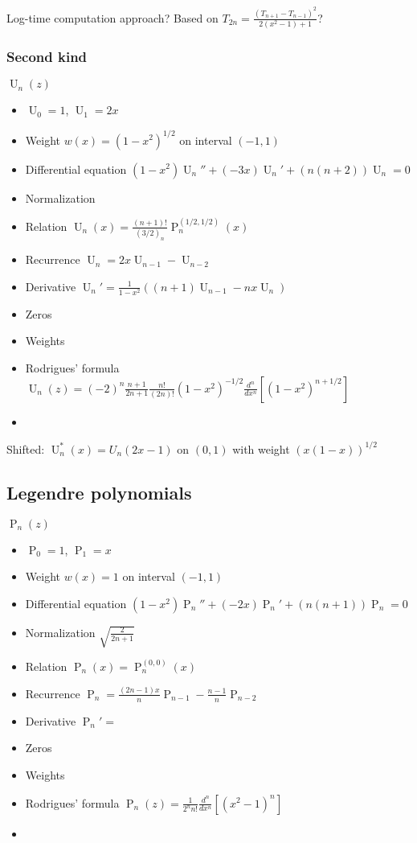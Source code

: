 \documentclass[10pt,dvipdfmx,letterpaper,twoside]{article}
\let\O=\operatorname
\begin{document}
Log-time computation approach? Based on $T_{2n} = \frac{(T_{n+1}-T_{n-1})^2}{2(x^2-1)+1}$?

\subsubsection{Second kind}
$\O{U}_n(z)$
\begin{itemize}
\item $\O{U}_0 = 1$, $\O{U}_1 = 2x$
\item Weight $w(x) = (1-x^2)^{1/2}$ on interval $(-1,1)$
\item Differential equation $\left(1-x^2\right) \O{U}_n'' + \left(-3x\right) \O{U}_n' + \left(n(n+2)\right) \O{U}_n = 0$
\item Normalization $ $
\item Relation $\O{U}_n(x) = \frac{(n+1)!}{(3/2)_n} \O{P}_n^{(1/2, 1/2)}(x)$
\item Recurrence $\O{U}_n = 2 x \O{U}_{n-1} - \O{U}_{n-2}$
\item Derivative $\O{U}_n' = \frac{1}{1-x^2}\left( (n+1)\O{U}_{n-1} - n x \O{U}_{n} \right)$
\item Zeros
\item Weights
\item Rodrigues' formula $\O{U}_n(z) = (-2)^n\frac{n+1}{2n+1}\frac{n!}{(2n)!} (1-x^2)^{-1/2} \frac{d^n}{dx^n}\left[ (1-x^2)^{n+1/2} \right]$
\item 
\end{itemize}
Shifted: $\O{U}^*_n(x) = U_n(2x-1)$ on $(0,1)$ with weight $(x(1-x))^{1/2}$

\subsection{Legendre polynomials}
$\O{P}_n(z)$
\begin{itemize}
\item $\O{P}_0 = 1$, $\O{P}_1 = x$
\item Weight $w(x) = 1$ on interval $(-1,1)$
\item Differential equation $\left(1-x^2\right) \O{P}_n'' + \left(-2x\right) \O{P}_n' + \left(n(n+1)\right) \O{P}_n = 0$
\item Normalization $\sqrt{\frac{2}{2n+1}}$
\item Relation $\O{P}_n(x) = \O{P}_n^{(0,0)}(x)$
\item Recurrence $\O{P}_n = \frac{(2n-1)x}{n}\O{P}_{n-1} - \frac{n-1}{n}\O{P}_{n-2}$
\item Derivative $\O{P}_n' = $
\item Zeros
\item Weights
\item Rodrigues' formula $\O{P}_n(z) = \frac{1}{2^n n!}\frac{d^n}{dx^n}\left[ (x^2-1)^n \right]$
\item 
\end{itemize}
\end{document}
